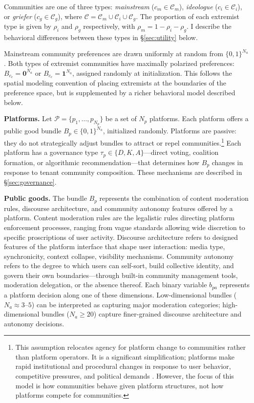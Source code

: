 \documentclass{article}
\begin{document}
Communities are one of three types: \textit{mainstream} ($c_m \in \mathcal{C}_m$), \textit{ideologue} ($c_i \in \mathcal{C}_i$), or \textit{griefer} ($c_g \in \mathcal{C}_g$), where $\mathcal{C} = \mathcal{C}_m \cup \mathcal{C}_i \cup \mathcal{C}_g$. The proportion of each extremist type is given by $\rho_i$ and $\rho_g$ respectively, with $\rho_m = 1 - \rho_i - \rho_g$. I describe the behavioral differences between these types in \S\ref{sec:utility} below.

Mainstream community preferences are drawn uniformly at random from $\{0,1\}^{N_a}$. Both types of extremist communities have maximally polarized preferences: $B_{c_e} = \mathbf{0}^{N_a}$ or $B_{c_e} = \mathbf{1}^{N_a}$, assigned randomly at initialization. This follows the spatial modeling convention of placing extremists at the boundaries of the preference space, but is supplemented by a richer behavioral model described below.

\textbf{Platforms.} Let $\mathcal{P} = \{p_1, \ldots, p_{N_p}\}$ be a set of $N_p$ platforms. Each platform offers a public good bundle $B_p \in \{0,1\}^{N_a}$, initialized randomly. Platforms are passive: they do not strategically adjust bundles to attract or repel communities.\footnote{This assumption relocates agency for platform change to communities rather than platform operators. It is a significant simplification; platforms make rapid institutional and procedural changes in response to user behavior, competitive pressures, and political demands \citep{klonick2017new}. However, the focus of this model is how communities behave given platform structures, not how platforms compete for communities.} Each platform has a governance type $\tau_p \in \{D, K, A\}$---direct voting, coalition formation, or algorithmic recommendation---that determines how $B_p$ changes in response to tenant community composition. These mechanisms are described in \S\ref{sec:governance}.

\textbf{Public goods.} The bundle $B_p$ represents the combination of content moderation rules, discourse architecture, and community autonomy features offered by a platform. Content moderation rules are the legalistic rules directing platform enforcement processes, ranging from vague standards allowing wide discretion to specific proscriptions of user activity. Discourse architecture refers to designed features of the platform interface that shape user interaction: media type, synchronicity, context collapse, visibility mechanisms. Community autonomy refers to the degree to which users can self-sort, build collective identity, and govern their own boundaries---through built-in community management tools, moderation delegation, or the absence thereof. Each binary variable $b_{pa}$ represents a platform decision along one of these dimensions. Low-dimensional bundles ($N_a \approx 3$--$5$) can be interpreted as capturing major moderation categories; high-dimensional bundles ($N_a \geq 20$) capture finer-grained discourse architecture and autonomy decisions.
\end{document}
